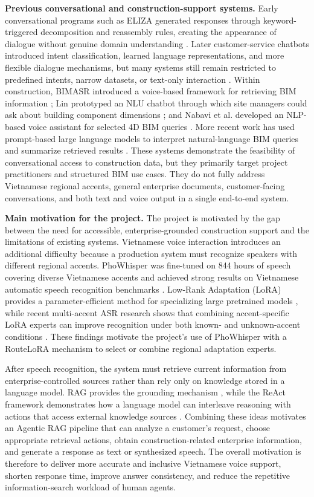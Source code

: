 \documentclass[11pt,a4paper]{article}
\begin{document}
\textbf{Previous conversational and construction-support systems.}
Early conversational programs such as ELIZA generated responses through
keyword-triggered decomposition and reassembly rules, creating the appearance
of dialogue without genuine domain understanding \cite{weizenbaum1966}. Later
customer-service chatbots introduced intent classification, learned language
representations, and more flexible dialogue mechanisms, but many systems still
remain restricted to predefined intents, narrow datasets, or text-only
interaction \cite{suhaili2021}. Within construction, BIMASR introduced a
voice-based framework for retrieving BIM information \cite{shin2021}; Lin
prototyped an NLU chatbot through which site managers could ask about building
component dimensions \cite{lin2023}; and Nabavi et al. developed an NLP-based
voice assistant for selected 4D BIM queries \cite{nabavi2023}. More recent work
has used prompt-based large language models to interpret natural-language BIM
queries and summarize retrieved results \cite{zheng2023}. These systems
demonstrate the feasibility of conversational access to construction data, but
they primarily target project practitioners and structured BIM use cases.
They do not fully address Vietnamese regional accents, general enterprise
documents, customer-facing conversations, and both text and voice output in a
single end-to-end system.

\textbf{Main motivation for the project.}
The project is motivated by the gap between the need for accessible,
enterprise-grounded construction support and the limitations of existing
systems. Vietnamese voice interaction introduces an additional difficulty
because a production system must recognize speakers with different regional
accents. PhoWhisper was fine-tuned on 844 hours of speech covering diverse
Vietnamese accents and achieved strong results on Vietnamese automatic speech
recognition benchmarks \cite{le2024}. Low-Rank Adaptation (LoRA) provides a
parameter-efficient method for specializing large pretrained models
\cite{hu2022}, while recent multi-accent ASR research shows that combining
accent-specific LoRA experts can improve recognition under both known- and
unknown-accent conditions \cite{bagat2025}. These findings motivate the
project's use of PhoWhisper with a RouteLoRA mechanism to select or combine
regional adaptation experts.

After speech recognition, the system must retrieve current information from
enterprise-controlled sources rather than rely only on knowledge stored in a
language model. RAG provides the grounding mechanism \cite{lewis2020}, while
the ReAct framework demonstrates how a language model can interleave reasoning
with actions that access external knowledge sources \cite{yao2023}. Combining
these ideas motivates an Agentic RAG pipeline that can analyze a customer's
request, choose appropriate retrieval actions, obtain construction-related
enterprise information, and generate a response as text or synthesized speech.
The overall motivation is therefore to deliver more accurate and inclusive
Vietnamese voice support, shorten response time, improve answer consistency,
and reduce the repetitive information-search workload of human agents.
\end{document}
